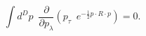\begin{equation}\label{dp1}
    \int d^Dp\,\,\,
        \frac{\partial}{\partial p_{\lambda}}
    \left(
        p_{\tau}\,\,\,
        e^{-\frac{1}{2}p\cdot R\cdot p}
    \right)
    =0.
\end{equation}

